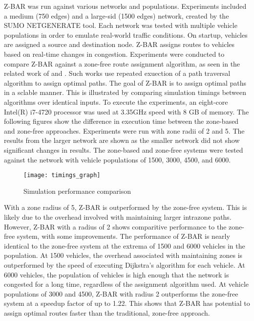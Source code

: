 \documentclass[conference]{IEEEtran}
\begin{document}
Z-BAR was run against various networks and populations. Experiments included a medium (750 edges) and a large-sid (1500 edges) network, created by the SUMO NETGENERATE tool. Each network was tested with multiple vehicle populations in order to emulate real-world traffic conditions. On startup, vehicles are assigned a source and destination node. Z-BAR assigns routes to vehicles based on real-time changes in congestion. Experiments were conducted to compare Z-BAR against a zone-free route assignment algorithm, as seen in the related work of \cite{iaco} and \cite{dtpos}. Such works use repeated exuection of a path traversal algorithm to assign optimal paths. The goal of Z-BAR is to assign optimal paths in a sclable manner. This is illustrated by comparing simulation timings between algorithms over identical inputs. To execute the experiments, an eight-core Intel(R) i7-4720 processor was used at 3.35GHz speed with 8 GB of memory. The following figures show the difference in execution time between the zone-based and zone-free approaches. Experiments were run with zone radii of 2 and 5. The results from the larger network are shown as the smaller network did not show significant changes in results. The zone-based and zone-free systems were tested against the network with vehicle populations of 1500, 3000, 4500, and 6000.

\begin{figure}[h]
\caption{Simulation performance comparison}
\centering
\texttt{[image: timings\_graph]}
\end{figure}

With a zone radius of 5, Z-BAR is outperformed by the zone-free system. This is likely due to the overhead involved with maintaining larger intrazone paths. However, Z-BAR with a radius of 2 shows comparitive performance to the zone-free system, with some improvements. The performance of Z-BAR is nearly identical to the zone-free system at the extrema of 1500 and 6000 vehicles in the population. At 1500 vehicles, the overhead associated with maintaining zones is outperformed by the speed of executing Dijkstra's algorithm for each vehicle. At 6000 vehicles, the population of vehicles is high enough that the network is congested for a long time, regardless of the assignment algorithm used. At vehicle populations of 3000 and 4500, Z-BAR with radius 2 outperforms the zone-free system at a speedup factor of up to 1.22. This shows that Z-BAR has potential to assign optimal routes faster than the traditional, zone-free approach.
\end{document}

